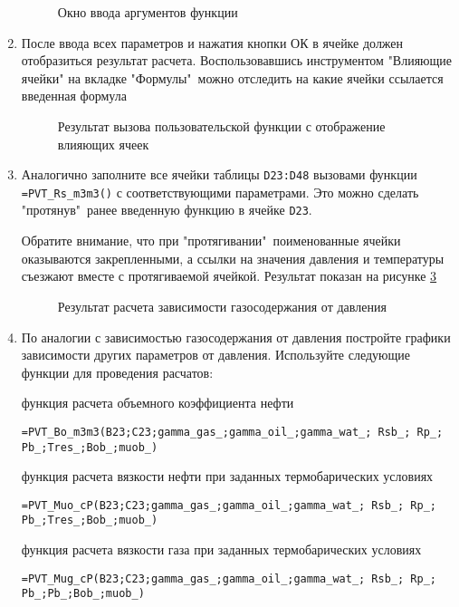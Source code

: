 \begin{enumerate}
	\begin{figure}[h!]
		\center{\texttt{[image: Ex10\_3]}}
		\caption{Окно ввода аргументов функции}
		\label{ris:Ex10_3}
	\end{figure}

	\item После ввода всех параметров и нажатия кнопки ОК в ячейке должен отобразиться результат расчета. Воспользовавшись инструментом "Влияющие ячейки" на вкладке "Формулы"\ можно отследить на какие ячейки ссылается введенная формула
	\begin{figure}[h!]
		\center{\texttt{[image: Ex10\_4]}}
		\caption{Результат вызова пользовательской функции с отображение влияющих ячеек}
		\label{ris:Ex10_4}
	\end{figure}

	\item Аналогично заполните все ячейки таблицы  \texttt{D23:D48} вызовами функции \texttt{=PVT\_Rs\_m3m3()} с соответствующими параметрами. Это можно сделать "протянув"\ ранее введенную функцию в ячейке \texttt{D23}.
	
	Обратите внимание, что при "протягивании"\ поименованные ячейки оказываются закрепленными, а ссылки на значения давления и температуры съезжают вместе с протягиваемой ячейкой. Результат показан на рисунке \ref{ris:Ex10_5}
	\begin{figure}[h!]
		\center{\texttt{[image: Ex10\_5]}}
		\caption{Результат расчета зависимости газосодержания от давления}
		\label{ris:Ex10_5}
	\end{figure}

	\item По аналогии с зависимостью газосодержания от давления постройте графики зависимости других параметров от давления. Используйте следующие функции для проведения расчатов: 
	
	функция расчета объемного коэффициента нефти
	
	{ \small  \texttt{=PVT\_Bo\_m3m3(B23;C23;gamma\_gas\_;gamma\_oil\_;gamma\_wat\_; Rsb\_; Rp\_; Pb\_;Tres\_;Bob\_;muob\_)}}
	
	функция расчета вязкости нефти при заданных термобарических условиях
	
	{ \small  \texttt{=PVT\_Muo\_cP(B23;C23;gamma\_gas\_;gamma\_oil\_;gamma\_wat\_; Rsb\_; Rp\_; Pb\_;Tres\_;Bob\_;muob\_)}}
	
    функция расчета вязкости газа при заданных термобарических условиях
	
	{ \small  \texttt{=PVT\_Mug\_cP(B23;C23;gamma\_gas\_;gamma\_oil\_;gamma\_wat\_; Rsb\_; Rp\_; Pb\_;Pb\_;Bob\_;muob\_)}}
	

\end{enumerate}
